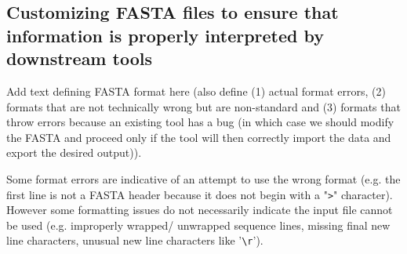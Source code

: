 \subsection{Customizing FASTA files to ensure that information is properly interpreted by downstream tools}
Add text defining FASTA format here (also define (1) actual format errors, (2) formats that are not technically wrong but are non-standard and (3) formats that throw errors because an existing tool has a bug (in which case we should modify the FASTA and proceed only if the tool will then correctly import the data and export the desired output)).

Some format errors are indicative of an attempt to use the wrong format (e.g. the first line is not a FASTA header because it does not begin with a "\verb|>|" character). However some formatting issues do not necessarily indicate the input file cannot be used (e.g. improperly wrapped/ unwrapped sequence lines, missing final new line characters, unusual new line characters like '\verb|\r|').
  
  
  
  
  